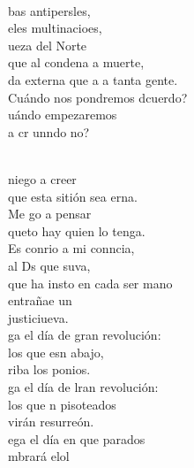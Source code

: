 \documentclass[12pt]{article}
\begin{document}
\begin{multicols*}{2}
\begin{cancion}
	\jump\\
	bas antipersles,\\
	eles multinacioes,\\
	ueza del Norte\\
	que al  condena a muerte,\\
	da externa que a a tanta gente.\\
	Cuándo nos pondremos dcuerdo?\\
	uándo empezaremos\\
	a cr unndo no?  \\\jump\\
	\begin{chorus}%
	 niego a creer\\
	que esta sitión sea erna.\\
	Me go a pensar \\
	queto hay quien lo tenga.\\
	Es conrio a mi conncia,\\
	al Ds que suva,\\
	que ha insto en cada ser mano\\
	entrañae un\\
	justiciueva.   \\
\jump
	ga el día de gran revolución:\\
	los que esn abajo,  \\
	riba los ponios.\\
	ga el día de lran revolución:\\
	los que n pisoteados \\
	virán resurreón.\\
\jump
	ega el día en que parados\\
	mbrará elol\\
	\end{chorus}%
	\jump\\
\end{cancion}%


\end{multicols*}
\end{document}
